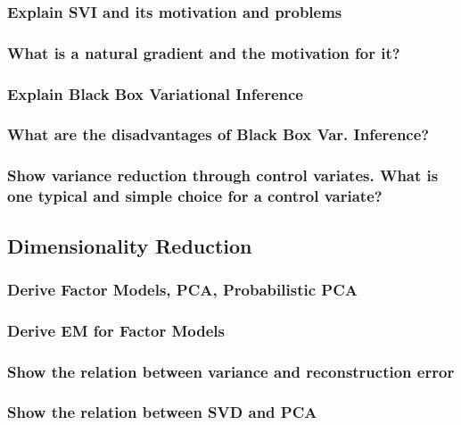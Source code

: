 \documentclass{article}
\begin{document}
\subsubsection{Explain SVI and its motivation and problems}

\subsubsection{What is a natural gradient and the motivation for it?}

\subsubsection{Explain Black Box Variational Inference}

\subsubsection{What are the disadvantages of Black Box Var. Inference?}

\subsubsection{Show variance reduction through control variates. What is one typical and simple choice for a control variate?}






\subsection{Dimensionality Reduction}

\subsubsection{Derive Factor Models, PCA, Probabilistic PCA}

\subsubsection{Derive EM for Factor Models}

\subsubsection{Show the relation between variance and reconstruction error}

\subsubsection{Show the relation between SVD and PCA}
\end{document}
